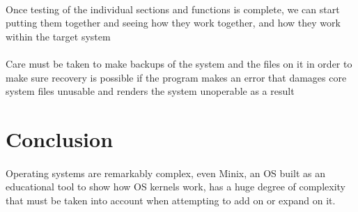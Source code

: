 \documentclass{article}
\begin{document}
    \paragraph{}Once testing of the individual sections and functions is complete, we can start putting them together and seeing how they work together, and how they work within the target system
    \paragraph{}Care must be taken to make backups of the system and the files on it in order to make sure recovery is possible if the program makes an error that damages core system files unusable and renders the system unoperable as a result


\section{Conclusion}
    \paragraph{}Operating systems are remarkably complex, even Minix, an OS built as an educational tool to show how OS kernels work, has a huge degree of complexity that must be taken into account when attempting to add on or expand on it.

\printbibliography
\end{document}
